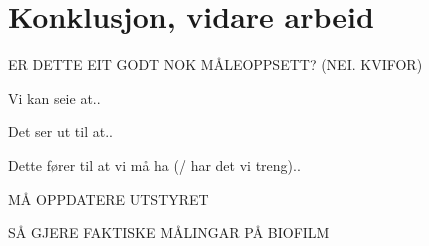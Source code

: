 \section{Konklusjon, vidare arbeid}
ER DETTE EIT GODT NOK MÅLEOPPSETT? (NEI. KVIFOR)

Vi kan seie at..

Det ser ut til at..

Dette fører til at vi må ha (/ har det vi treng)..
 
MÅ OPPDATERE UTSTYRET

SÅ GJERE FAKTISKE MÅLINGAR PÅ BIOFILM

